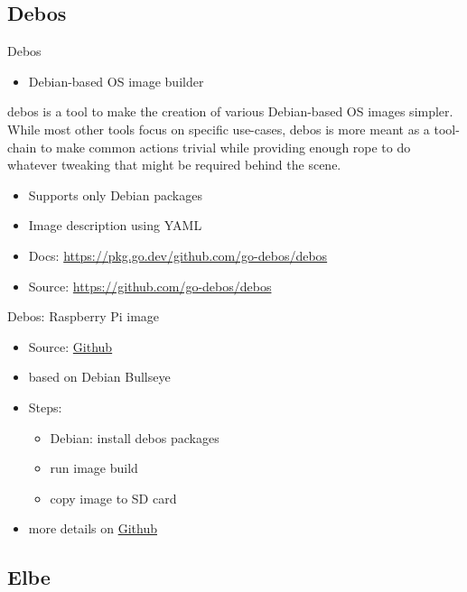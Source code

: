 \documentclass{beamer}
\begin{document}
\subsection{Debos}

\begin{frame}{Debos}
	\begin{itemize}
		\item Debian-based OS image builder
	\end{itemize}
	\begin{definition} 
		debos is a tool to make the creation of various Debian-based OS images simpler. While most other tools focus on specific use-cases, debos is more meant as a tool-chain to make common actions trivial while providing enough rope to do whatever tweaking that might be required behind the scene.
	\end{definition}
	\begin{itemize}
		\item Supports only Debian packages
		\item Image description using YAML
		\item Docs: \url{https://pkg.go.dev/github.com/go-debos/debos}
		\item Source: \url{https://github.com/go-debos/debos}
	\end{itemize}
\end{frame}

\begin{frame}{Debos: Raspberry Pi image}
	\begin{itemize}
		\item Source: \href{https://github.com/go-debos/debos-recipes/tree/main/rpi64}{Github}
		\item based on Debian Bullseye
		\item Steps:
		\begin{itemize}
			\item Debian: install debos packages
			\item run image build
			\item copy image to SD card
		\end{itemize}
		\item more details on \href{https://github.com/tomirgang/eh21_maintainable_linux/tree/main/examples/first_build_rpi4/debos}{Github}
	\end{itemize}
\end{frame}

\subsection{Elbe}
\end{document}
